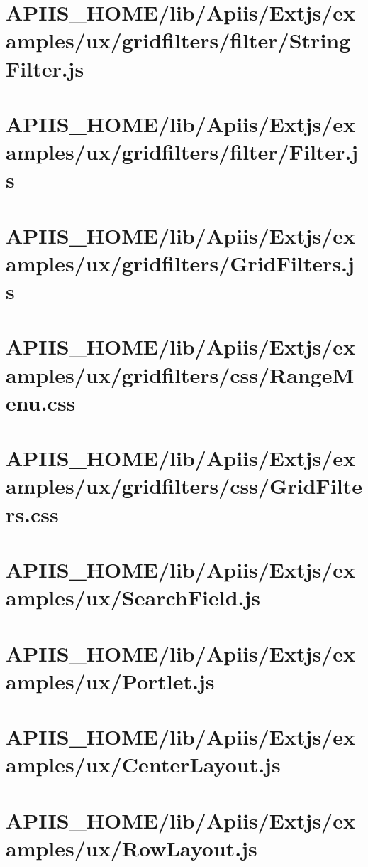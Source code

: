 \section{APIIS\_HOME/lib/Apiis/Extjs/examples/ux/gridfilters/filter/StringFilter.js} 
\section{APIIS\_HOME/lib/Apiis/Extjs/examples/ux/gridfilters/filter/Filter.js} 
\section{APIIS\_HOME/lib/Apiis/Extjs/examples/ux/gridfilters/GridFilters.js} 
\section{APIIS\_HOME/lib/Apiis/Extjs/examples/ux/gridfilters/css/RangeMenu.css} 
\section{APIIS\_HOME/lib/Apiis/Extjs/examples/ux/gridfilters/css/GridFilters.css} 
\section{APIIS\_HOME/lib/Apiis/Extjs/examples/ux/SearchField.js} 
\section{APIIS\_HOME/lib/Apiis/Extjs/examples/ux/Portlet.js} 
\section{APIIS\_HOME/lib/Apiis/Extjs/examples/ux/CenterLayout.js} 
\section{APIIS\_HOME/lib/Apiis/Extjs/examples/ux/RowLayout.js} 
